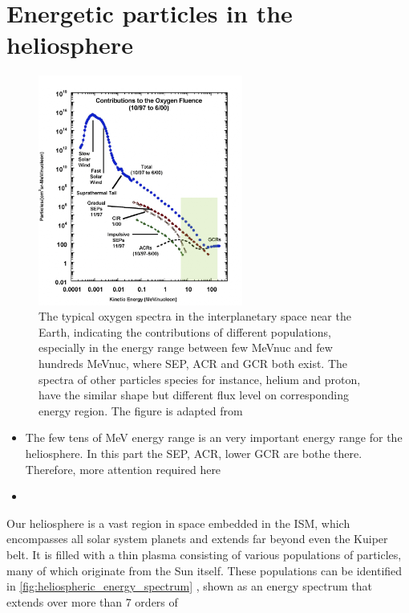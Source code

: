 \section{Energetic particles in the heliosphere}
\label{sec:particles_heliosphere}
\begin{figure}
	\centering
	\includegraphics[width = 0.6\textwidth]{images/heliospheric_particle_spectra_color.png}
	\caption[Energy spectra of oxygen ions in the near Earth space]{The typical oxygen spectra in the interplanetary space near the Earth, indicating the contributions of different populations, especially in the energy range between few MeV\/nuc and few hundreds MeV\/nuc, where \acs{SEP}, \acs{ACR} and \acs{GCR} both exist. The spectra of other particles species for instance, helium and proton, have the similar shape but different flux level on corresponding energy region. The figure is adapted from \cite{Mewaldt-2001}}
	\label{Fig:Oxygen_spectra_heliosphere}
\end{figure}

\begin{itemize}
	\item The few tens of MeV energy range is an very important energy range for the heliosphere. In this part the SEP, ACR, lower GCR are bothe there. Therefore, more attention required here
	\item 
\end{itemize}

Our heliosphere is a vast region in space embedded in the \ac{ISM}, which encompasses all solar system planets and extends far beyond even the Kuiper belt. 
It is filled with a thin plasma consisting of various populations of particles, many of which originate from the Sun itself. These populations can be identified in \autoref{fig:heliospheric_energy_spectrum} \citep[based on measurements by][]{Mewaldt-2001}, shown as an energy spectrum that extends over more than 7 orders of 

